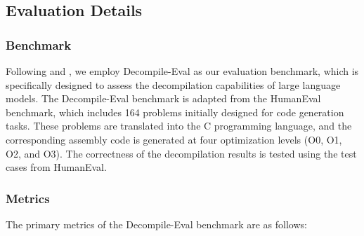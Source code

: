 
\subsection{Evaluation Details}


\subsubsection{Benchmark}

Following \citet{llm4decompile} and \citet{feng2024self}, we employ Decompile-Eval \citep{llm4decompile} as our evaluation benchmark, which is specifically designed to assess the decompilation capabilities of large language models.
% 
The Decompile-Eval benchmark\citep{llm4decompile} is adapted from the HumanEval benchmark\citep{humaneval}, which includes 164 problems initially designed for code generation tasks. These problems are translated into the C programming language, and the corresponding assembly code is generated at four optimization levels (O0, O1, O2, and O3). The correctness of the decompilation results is tested using the test cases from HumanEval.


\subsubsection{Metrics}
The primary metrics of the Decompile-Eval benchmark are as follows:%

